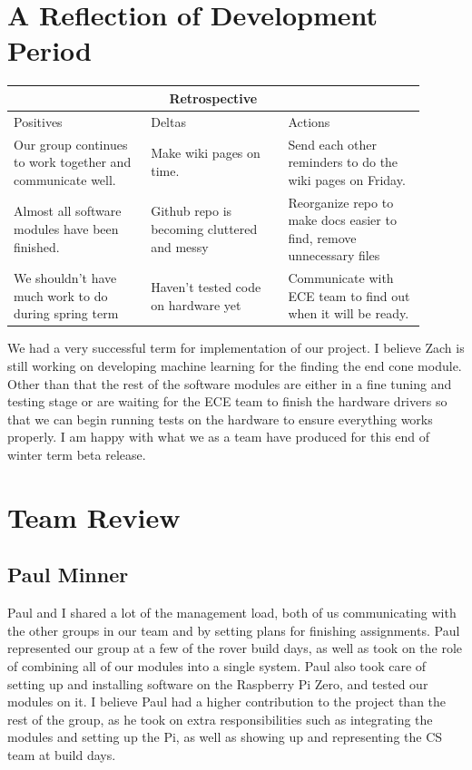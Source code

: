 \documentclass[10pt,letterpaper,onecolumn,draftclsnofoot,journal]{IEEEtran}
\begin{document}
\section{A Reflection of Development Period}
\begin{tabular}{ |p{0.3\linewidth}|p{0.3\linewidth}|p{0.3\linewidth}|  }
	\hline
	\multicolumn{3}{|c|}{Retrospective} \\
	\hline
	Positives& Deltas &Actions \\
	\hline
	Our group continues to work together and communicate well. &
	Make wiki pages on time.&
	Send each other reminders to do the wiki pages on Friday. \\
	
	Almost all software modules have been finished. &
	Github repo is becoming cluttered and messy &
	Reorganize repo to make docs easier to find, remove unnecessary files \\
	
	We shouldn't have much work to do during spring term &
	Haven't tested code on hardware yet & Communicate with ECE team to find out when it will be ready.  \\
	\hline
\end{tabular}
\vspace{1cm}
\par
We had a very successful term for implementation of our project. I believe Zach is still working on developing  machine learning for the finding the end cone module. Other than that the rest of the software modules are either in a fine tuning and testing stage or are waiting for the ECE team to finish the hardware drivers so that we can begin running tests on the hardware to ensure everything works properly. I am happy with what we as a team have produced for this end of winter term beta release.

\section{Team Review}
\subsection{Paul Minner}
Paul and I shared a lot of the management load, both of us communicating with the other groups in our team and by setting plans for finishing assignments. Paul represented our group at a few of the rover build days, as well as took on the role of combining all of our modules into a single system. Paul also took care of setting up and installing software on the Raspberry Pi Zero, and tested our modules on it. I believe Paul had a higher contribution to the project than the rest of the group, as he took on extra responsibilities such as integrating the modules and setting up the Pi, as well as showing up and representing the CS team at build days.
\end{document}
